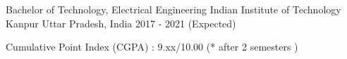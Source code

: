 
\begin{cventries}
  \cventry
    {Bachelor of Technology, Electrical Engineering}
    {Indian Institute of Technology Kanpur }
    {Uttar Pradesh, India}
    {2017 - 2021 (Expected)}
    {
      \begin{cvitems}
        \item {Cumulative Point Index (CGPA) : 9.xx/10.00  (* after 2 semesters )}  %
      \end{cvitems}
    }
\end{cventries}
